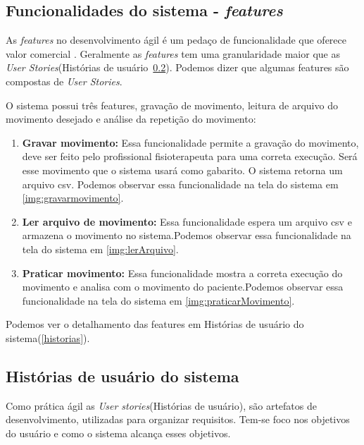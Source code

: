 \subsection{Funcionalidades do sistema - \textit{features}}\label{sub:features}
    As \textit{features} no desenvolvimento ágil é um pedaço de funcionalidade que oferece valor comercial \cite{versionOne}.
  Geralmente as \textit{features} tem uma granularidade maior que as \textit{User Stories}(Histórias de usuário~\ref{sec:Histórias de usuário}).
  Podemos dizer que algumas features são compostas de \textit{User Stories}.

    O sistema possui três features, gravação de movimento, leitura de arquivo do movimento desejado e análise da repetição do movimento:
  \begin{enumerate}
    \item \textbf{Gravar movimento:} Essa funcionalidade permite a gravação do movimento, deve ser feito pelo profissional fisioterapeuta
    para uma correta execução. Será esse movimento que o sistema usará como gabarito. O sistema retorna um arquivo csv. Podemos observar essa funcionalidade
    na tela do sistema em \ref{img:gravarmovimento}.

    \item \textbf{Ler arquivo de movimento:} Essa funcionalidade espera um arquivo csv e armazena o movimento no sistema.Podemos observar essa funcionalidade
    na tela do sistema em \ref{img:lerArquivo}.

    \item \textbf{Praticar movimento:} Essa funcionalidade mostra a correta execução do movimento e analisa com o movimento do paciente.Podemos observar essa funcionalidade
    na tela do sistema em \ref{img:praticarMovimento}.

  \end{enumerate}

  Podemos ver o detalhamento das features em Histórias de usuário do sistema(\ref{historias}).
\subsection{Histórias de usuário do sistema}
\label{sec:Histórias de usuário}
  Como prática ágil as \textit{User stories}(Histórias de usuário), são artefatos
de desenvolvimento, utilizadas para organizar requisitos. Tem-se foco nos objetivos
do usuário e como o sistema alcança esses objetivos.

